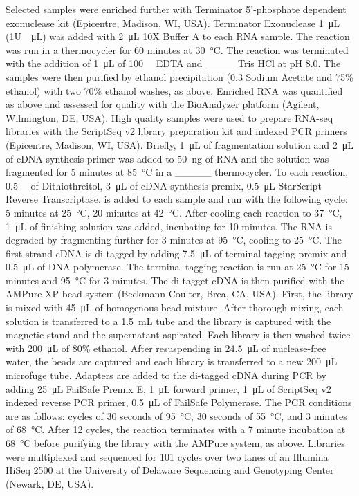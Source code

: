 Selected samples were enriched further with Terminator 5'-phosphate dependent exonuclease kit (Epicentre, Madison, WI, USA). Terminator Exonuclease \SI{1}{\micro\liter} (1U\SI{}{\per\micro\liter}) was added with \SI{2}{\micro\liter} 10X Buffer A to each RNA sample. The reaction was run in a      thermocycler for 60 minutes at \SI{30}{\degreeCelsius}. The reaction was terminated with the addition of \SI{1}{\micro\liter} of \SI{100}{\milli\Molar} EDTA and ____ Tris HCl at pH 8.0. The samples were then purified by ethanol precipitation (\SI{0.3}{\Molar} Sodium Acetate and 75\% ethanol) with two 70\% ethanol washes, as above.
Enriched RNA was quantified as above and assessed for quality with the BioAnalyzer platform (Agilent, Wilmington, DE, USA). High quality samples were used to prepare RNA-seq libraries with the ScriptSeq v2 library preparation kit and indexed PCR primers (Epicentre, Madison, WI, USA). Briefly,  \SI{1}{\micro\liter} of fragmentation solution and \SI{2}{\micro\liter} of cDNA synthesis primer was added to \SI{50}{\nano\gram} of RNA and the solution was fragmented for 5 minutes at \SI{85}{\degreeCelsius} in a _____ thermocycler. To each reaction, \SI{0.5}{\milli\Molar} of Dithiothreitol, \SI{3}{\micro\liter} of cDNA synthesis premix, \SI{0.5}{\micro\liter} StarScript Reverse Transcriptase. is added to each sample and run with the following cycle: 5 minutes at \SI{25}{\degreeCelsius}, 20 minutes at \SI{42}{\degreeCelsius}. After cooling each reaction to \SI{37}{\degreeCelsius}, \SI{1}{\micro\liter} of finishing solution was added, incubating for 10 minutes. The RNA is degraded by fragmenting further for 3 minutes at \SI{95}{\degreeCelsius}, cooling to \SI{25}{\degreeCelsius}. The first strand cDNA is di-tagged by adding \SI{7.5}{\micro\liter} of terminal tagging premix and \SI{0.5}{\micro\liter} of DNA polymerase. The terminal tagging reaction is run at \SI{25}{\degreeCelsius} for 15 minutes and \SI{95}{\degreeCelsius} for 3 minutes. The di-tagget cDNA is then purified with the AMPure XP bead system (Beckmann Coulter, Brea, CA, USA). First, the library is mixed with \SI{45}{\micro\liter} of homogenous bead mixture. After thorough mixing, each solution is transferred to a \SI{1.5}{\milli\liter} tube and the library is captured with the magnetic stand and the supernatant aspirated. Each library is then washed twice with \SI{200}{\micro\liter} of 80\% ethanol. After resuspending in \SI{24.5}{\micro\liter} of nuclease-free water, the beads are captured and each library is transferred to a new \SI{200}{\micro\liter} microfuge tube. Adapters are added to the di-tagged cDNA during PCR by adding \SI{25}{\micro\liter} FailSafe Premix E, \SI{1}{\micro\liter} forward primer, \SI{1}{\micro\liter} of ScriptSeq v2 indexed reverse PCR primer, \SI{0.5}{\micro\liter} of FailSafe Polymerase. The PCR conditions are as follows: cycles of 30 seconds of \SI{95}{\degreeCelsius}, 30 seconds of \SI{55}{\degreeCelsius}, and 3 minutes of \SI{68}{\degreeCelsius}. After 12 cycles, the reaction terminates with a 7 minute incubation at \SI{68}{\degreeCelsius} before purifying the library with the AMPure system, as above.  Libraries were multiplexed and sequenced for 101 cycles over two lanes of an Illumina HiSeq 2500 at the University of Delaware Sequencing and Genotyping Center (Newark, DE, USA).
